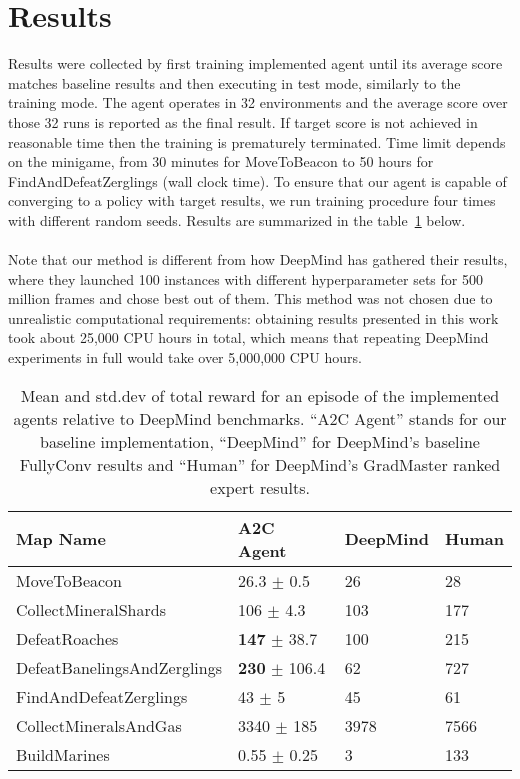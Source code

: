 \section{Results}

Results were collected by first training implemented agent until its average score matches baseline results and then executing in test mode, similarly to the training mode. The agent operates in 32 environments and the average score over those 32 runs is reported as the final result. If target score is not achieved in reasonable time then the training is prematurely terminated. Time limit depends on the minigame, from 30 minutes for MoveToBeacon to 50 hours for FindAndDefeatZerglings (wall clock time). To ensure that our agent is capable of converging to a policy with target results, we run training procedure four times with different random seeds. Results are summarized in the table~\ref{tab:results} below.
\\\\
Note that our method is different from how DeepMind has gathered their results, where they launched 100 instances with different hyperparameter sets for 500 million frames and chose best out of them. This method was not chosen due to unrealistic computational requirements: obtaining results presented in this work took about 25,000 CPU hours in total, which means that repeating DeepMind experiments in full would take over 5,000,000 CPU hours.

\begin{table}[h]
\centering
\begin{tabular}{| l | l | l | l |}
\hline
\bf{Map Name} & \bf{A2C Agent} & \bf{DeepMind} & \bf{Human} \\
\hline
MoveToBeacon & 26.3 $\pm$ 0.5 & 26 & 28 \\
\hline
CollectMineralShards & 106 $\pm$ 4.3 & 103 & 177 \\
\hline
DefeatRoaches & \textbf{147} $\pm$ 38.7 & 100 & 215 \\
\hline
DefeatBanelingsAndZerglings & \textbf{230} $\pm$ 106.4 & 62 & 727 \\
\hline
FindAndDefeatZerglings & 43 $\pm$ 5 & 45 & 61 \\
\hline
CollectMineralsAndGas & 3340 $\pm$ 185 & 3978 & 7566 \\
\hline
BuildMarines & 0.55 $\pm$ 0.25 & 3 & 133 \\
\hline
\end{tabular}
\caption{Mean and std.dev of total reward for an episode of the implemented agents relative to DeepMind benchmarks. ``A2C Agent'' stands for our baseline implementation, ``DeepMind'' for DeepMind's baseline FullyConv results and ``Human'' for DeepMind's GradMaster ranked expert results.}
\label{tab:results}
\end{table}

